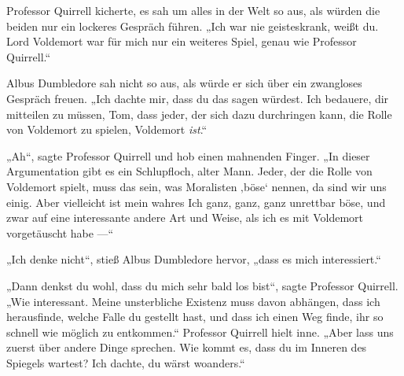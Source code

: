 Professor Quirrell kicherte, es sah um alles in der Welt so aus, als würden die beiden nur ein lockeres Gespräch führen.
„Ich war nie geisteskrank, weißt du. Lord Voldemort war für mich nur ein weiteres Spiel, genau wie Professor Quirrell.“

Albus Dumbledore sah nicht so aus, als würde er sich über ein zwangloses Gespräch freuen.
„Ich dachte mir, dass du das sagen würdest. Ich bedauere, dir mitteilen zu müssen, Tom, dass jeder, der sich dazu durchringen kann, die Rolle von Voldemort zu spielen, Voldemort \emph{ist}.“

„Ah“, sagte Professor Quirrell und hob einen mahnenden Finger.
„In dieser Argumentation gibt es ein Schlupfloch, alter Mann. Jeder, der die Rolle von Voldemort spielt, muss das sein, was Moralisten ‚böse‘ nennen, da sind wir uns einig. Aber vielleicht ist mein wahres Ich ganz, ganz, ganz unrettbar böse, und zwar auf eine interessante andere Art und Weise, als ich es mit Voldemort vorgetäuscht habe —“

„Ich denke nicht“, stieß Albus Dumbledore hervor, „dass es mich interessiert.“

„Dann denkst du wohl, dass du mich sehr bald los bist“, sagte Professor Quirrell.
„Wie interessant. Meine unsterbliche Existenz muss davon abhängen, dass ich herausfinde, welche Falle du gestellt hast, und dass ich einen Weg finde, ihr so schnell wie möglich zu entkommen.“ Professor Quirrell hielt inne.
„Aber lass uns zuerst über andere Dinge sprechen. Wie kommt es, dass du im Inneren des Spiegels wartest? Ich dachte, du wärst woanders.“


